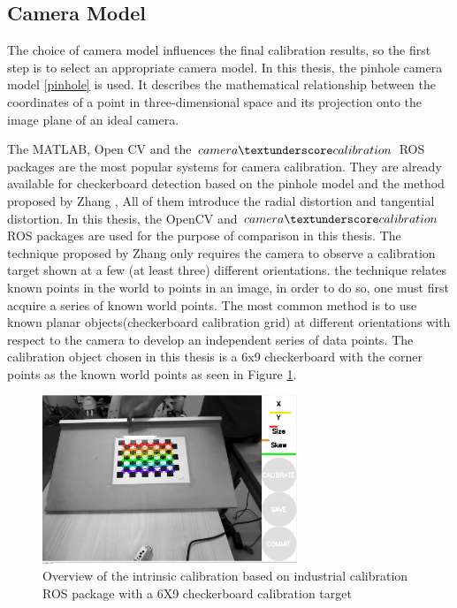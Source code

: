 \subsection{Camera Model} \label{intrinsic}

The choice of camera model influences the final calibration results, so the first step is to select an appropriate camera model. In this thesis, the pinhole camera model \ref{pinhole} is used. It describes the mathematical relationship between the coordinates of a point in three-dimensional space and its projection onto the image plane of an ideal camera. 

The MATLAB, Open CV  and the $camera\textunderscore calibration$ ROS  \cite{calRos} packages are the most popular systems for camera calibration. They are already available for checkerboard detection based on the pinhole model and the method proposed by Zhang \cite{Zhang}, All of them introduce the radial distortion and tangential distortion. In this thesis, the OpenCV and $camera\textunderscore calibration$ ROS packages are used for the purpose of comparison in this thesis.
The technique proposed by Zhang only requires the camera to observe a calibration target shown at a few (at least three) different orientations. the technique relates known points in the world to points in an image, in order to do so, one must first acquire a series of known world points. The most common method is to use known planar objects(checkerboard calibration grid) at different orientations with respect to the camera to develop an independent series of data points. The calibration object chosen in this thesis is a 6x9 checkerboard with the corner points as the known world points as seen in Figure \ref{fig:target0}.

\begin{figure}[!h]
\begin{center}
\includegraphics[width=3in]{figures03/intros.png}
\caption{Overview of the intrinsic calibration based on industrial calibration ROS package with a 6X9 checkerboard calibration target}%
\label{fig:target0}
\end{center}
\end{figure}

